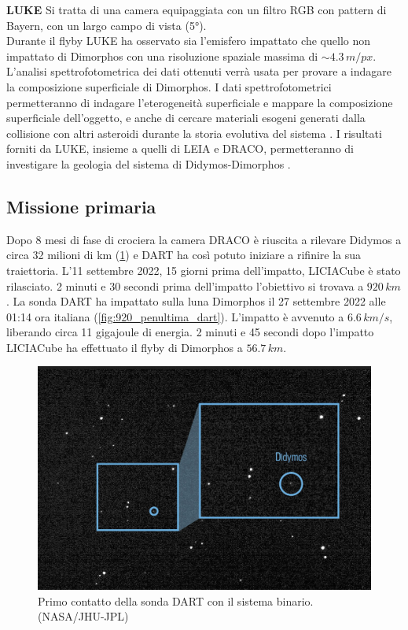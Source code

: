 \documentclass[a4paper,11pt,openright]{book}
\begin{document}
\qquad \small{\textbf{LUKE}} Si tratta di una camera equipaggiata con un filtro RGB con pattern di Bayern, con un largo campo di vista (5°).\\
Durante il flyby LUKE ha osservato sia l'emisfero impattato che quello non impattato di Dimorphos con una risoluzione spaziale massima di $\sim 4.3\,m/px$. L'analisi spettrofotometrica dei dati ottenuti verrà usata per provare a indagare la composizione superficiale di Dimorphos. I dati spettrofotometrici permetteranno di indagare l'eterogeneità superficiale e mappare la composizione superficiale dell'oggetto, e anche di cercare materiali esogeni generati dalla collisione con altri asteroidi durante la storia evolutiva del sistema \citep{poggiali_expected_2022}. I risultati forniti da LUKE, insieme a quelli di LEIA e DRACO, permetteranno di investigare la geologia del sistema di Didymos-Dimorphos \citep{pajola_anticipated_2022}.

\subsection{Missione primaria}
Dopo 8 mesi di fase di crociera la camera DRACO è riuscita a rilevare Didymos a circa 32 milioni di km (\cref{fig:primo_contatto}) e DART ha così potuto iniziare a rifinire la sua traiettoria. 
L'11 settembre 2022, 15 giorni prima dell'impatto, LICIACube è stato rilasciato. 2 minuti e 30 secondi prima dell'impatto l'obiettivo si trovava a $920\,km$. La sonda DART ha impattato sulla luna Dimorphos il 27 settembre 2022 alle 01:14 ora italiana (\cref{fig:920_penultima_dart}).
L'impatto è avvenuto a $6.6\,km/s$, liberando circa 11 gigajoule di energia.
2 minuti e 45 secondi dopo l'impatto LICIACube ha effettuato il flyby di Dimorphos a $56.7\,km$.

\begin{figure}[!h]
\centering
	\includegraphics[width=.8\textwidth]{figure/primo_contatto.jpg}
\caption[Primo contatto della sonda DART con il sistema binario.]{Primo contatto della sonda DART con il sistema binario. (NASA/JHU-JPL)}
\label{fig:primo_contatto}
\end{figure}
\end{document}
